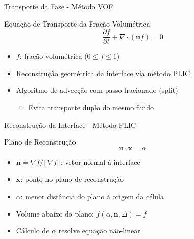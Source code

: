 \documentclass[../main/main.tex]{subfiles}
\begin{document}
\begin{frame}{Transporte da Fase - Método VOF}
  \begin{block}{Equação de Transporte da Fração Volumétrica}
    \[
      \frac{\partial f}{\partial t} + \nabla \cdot (\mathbf{u} f) = 0
    \]
  \end{block}
  \vspace{0.5cm}
  \begin{itemize}
    \item $f$: fração volumétrica ($0 \leq f \leq 1$)
    \item Reconstrução geométrica da interface via método PLIC
    \item Algoritmo de advecção com passo fracionado (split)
    \begin{itemize}
      \item Evita transporte duplo do mesmo fluido
    \end{itemize}
  \end{itemize}
\end{frame}

\begin{frame}{Reconstrução da Interface - Método PLIC}
  \begin{block}{Plano de Reconstrução}
    \[
      \mathbf{n} \cdot \mathbf{x} = \alpha
    \]
  \end{block}
  \vspace{0.5cm}
  \begin{itemize}
    \item $\mathbf{n} = \nabla f / ||\nabla f||$: vetor normal à interface
    \item $\mathbf{x}$: ponto no plano de reconstrução
    \item $\alpha$: menor distância do plano à origem da célula
    \item Volume abaixo do plano: $\bar{f}(\alpha, \mathbf{n}, \Delta) = f$
    \item Cálculo de $\alpha$ resolve equação não-linear
  \end{itemize}
\end{frame}
\end{document}
